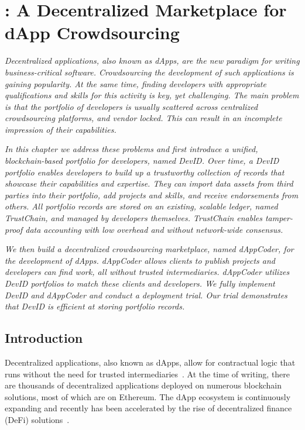 \chapter{\Dappcoder{}: A Decentralized Marketplace for dApp Crowdsourcing}
\label{chapter:devid}

\emph{Decentralized applications, also known as dApps, are the new paradigm for writing business-critical software.
Crowdsourcing the development of such applications is gaining popularity.
At the same time, finding developers with appropriate qualifications and skills for this activity is key, yet challenging.
The main problem is that the portfolio of developers is usually scattered across centralized crowdsourcing platforms, and vendor locked.
This can result in an incomplete impression of their capabilities.}

\emph{In this chapter we address these problems and first introduce a unified, blockchain-based portfolio for developers, named \emph{DevID}.
Over time, a DevID portfolio enables developers to build up a trustworthy collection of records that showcase their capabilities and expertise.
They can import data assets from third parties into their portfolio, add projects and skills, and receive endorsements from others.
All portfolio records are stored on an existing, scalable ledger, named TrustChain, and managed by developers themselves.
TrustChain enables tamper-proof data accounting with low overhead and without network-wide consensus.}

\emph{We then build a decentralized crowdsourcing marketplace, named \emph{dAppCoder}, for the development of dApps.
dAppCoder allows clients to publish projects and developers can find work, all without trusted intermediaries.
dAppCoder utilizes DevID portfolios to match these clients and developers.
We fully implement DevID and dAppCoder and conduct a deployment trial.
Our trial demonstrates that DevID is efficient at storing portfolio records. }

\newpage

\section{Introduction}
Decentralized applications, also known as dApps, allow for contractual logic that runs without the need for trusted intermediaries~\cite{raval2016decentralized}.
At the time of writing, there are thousands of decentralized applications deployed on numerous blockchain solutions, most of which are on Ethereum.
The dApp ecosystem is continuously expanding and recently has been accelerated by the rise of decentralized finance (DeFi) solutions~\cite{zetzsche2020decentralized}.

